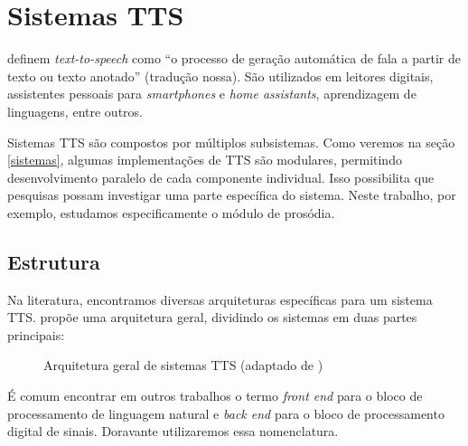 \section{Sistemas TTS}
 definem \emph{text-to-speech} como ``o processo de geração
automática de fala a partir de texto ou texto anotado'' (tradução nossa). São
utilizados em leitores digitais, assistentes pessoais para \emph{smartphones} e
\emph{home assistants}, aprendizagem de linguagens, entre outros.

Sistemas TTS são compostos por múltiplos subsistemas. Como veremos na seção
\ref{sistemas}, algumas implementações de TTS são modulares, permitindo
desenvolvimento paralelo de cada componente individual. Isso possibilita que
pesquisas possam investigar uma parte específica do sistema. Neste trabalho, por
exemplo, estudamos especificamente o módulo de prosódia. %

\subsection{Estrutura}
Na literatura, encontramos diversas arquiteturas específicas para um sistema TTS.
 propõe uma arquitetura geral, dividindo os sistemas em duas partes principais:

\begin{figure}[!htbp]
\centering
{}
\caption{Arquitetura geral de sistemas TTS (adaptado de )}
\label{fig:tts-arch}
\end{figure}

É comum encontrar em outros trabalhos o termo \emph{front end} para o
bloco de processamento de linguagem natural e \emph{back end} para o bloco de
processamento digital de sinais. Doravante utilizaremos essa nomenclatura.

